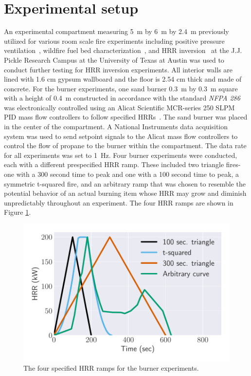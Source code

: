 \documentclass{article}
\begin{document}
\section{Experimental setup}
An experimental compartment measuring 5~m by 6~m by 2.4~m previously utilized for various room scale fire experiments including positive pressure ventilation~\cite{Weinschenk:2011}, wildfire fuel bed characterization~\cite{Overholt:2014}, and HRR inversion~\cite{Kurzawski:2017} at the J.J. Pickle Research Campus at the University of Texas at Austin was used to conduct further testing for HRR inversion experiments. All interior walls are lined with 1.6 cm gypsum wallboard and the floor is 2.54 cm thick and made of concrete. 
For the burner experiments, one sand burner 0.3~m by 0.3~m square with a height of 0.4~m constructed in accordance with the standard \textit{NFPA 286} was electronically controlled using an Alicat Scientific MCR-series 250 SLPM PID mass flow controllers to follow specified HRRs~\cite{NFPA:286}. The sand burner was placed in the center of the compartment. A National Instruments data acquisition system was used to send setpoint signals to the Alicat mass flow controllers to control the flow of propane to the burner within the compartment. The data rate for all experiments was set to 1~Hz. Four burner experiments were conducted, each with a different prespecified HRR ramp. These included two triangle fires- one with a 300 second time to peak and one with a 100 second time to peak, a symmetric t-squared fire, and an arbitrary ramp that was chosen to resemble the potential behavior of an actual burning item whose HRR may grow and diminish unpredictably throughout an experiment. The four HRR ramps are shown in Figure \ref{fig:burner_ramps}.

\begin{figure}[htb] \centering
\includegraphics[width=.75\textwidth]{figures/training_ramps.pdf}
\caption{The four specified HRR ramps for the burner experiments.}
\label{fig:burner_ramps}
    \end{figure}
\end{document}
